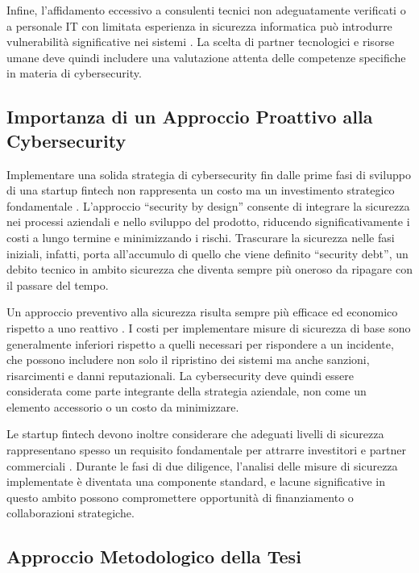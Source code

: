 \documentclass[a4paper,12pt]{report}
\begin{document}
Infine, l’affidamento eccessivo a consulenti tecnici non adeguatamente verificati o a personale IT con limitata esperienza in sicurezza informatica può introdurre vulnerabilità significative nei sistemi \cite{fintechChallenges}. La scelta di partner tecnologici e risorse umane deve quindi includere una valutazione attenta delle competenze specifiche in materia di cybersecurity.

\subsection*{Importanza di un Approccio Proattivo alla Cybersecurity}

Implementare una solida strategia di cybersecurity fin dalle prime fasi di sviluppo di una startup fintech non rappresenta un costo ma un investimento strategico fondamentale \cite{fintechChallenges}. L’approccio “security by design” consente di integrare la sicurezza nei processi aziendali e nello sviluppo del prodotto, riducendo significativamente i costi a lungo termine e minimizzando i rischi. Trascurare la sicurezza nelle fasi iniziali, infatti, porta all’accumulo di quello che viene definito “security debt”, un debito tecnico in ambito sicurezza che diventa sempre più oneroso da ripagare con il passare del tempo.

Un approccio preventivo alla sicurezza risulta sempre più efficace ed economico rispetto a uno reattivo \cite{fintechChallenges}. I costi per implementare misure di sicurezza di base sono generalmente inferiori rispetto a quelli necessari per rispondere a un incidente, che possono includere non solo il ripristino dei sistemi ma anche sanzioni, risarcimenti e danni reputazionali. La cybersecurity deve quindi essere considerata come parte integrante della strategia aziendale, non come un elemento accessorio o un costo da minimizzare.

Le startup fintech devono inoltre considerare che adeguati livelli di sicurezza rappresentano spesso un requisito fondamentale per attrarre investitori e partner commerciali \cite{fintechChallenges}. Durante le fasi di due diligence, l’analisi delle misure di sicurezza implementate è diventata una componente standard, e lacune significative in questo ambito possono compromettere opportunità di finanziamento o collaborazioni strategiche.

\subsection*{Approccio Metodologico della Tesi}
\end{document}
